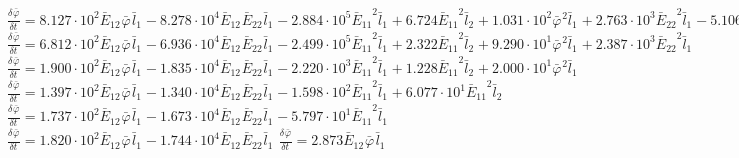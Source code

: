 $\frac{{\delta}^{} {\bar{\varphi}}_{}}{{\delta} {{{t}}_{}}^{}} = 8.127\cdot 10^{2}{{{\bar{E}}_{12}}^{}{{\bar{\varphi}}_{}}^{}{{\bar{l}}_{1}}^{}} - 8.278\cdot 10^{4}{{{\bar{E}}_{12}}^{}{{\bar{E}}_{22}}^{}{{\bar{l}}_{1}}^{}} - 2.884\cdot 10^{5}{{{\bar{E}}_{11}}^{2}{{\bar{l}}_{1}}^{}} + 6.724{{{\bar{E}}_{11}}^{2}{{\bar{l}}_{2}}^{}} + 1.031\cdot 10^{2}{{{\bar{\varphi}}_{}}^{2}{{\bar{l}}_{1}}^{}} + 2.763\cdot 10^{3}{{{\bar{E}}_{22}}^{2}{{\bar{l}}_{1}}^{}} - 5.106\cdot 10^{2}{{{\bar{E}}_{11}}^{2}}$
$\frac{{\delta}^{} {\bar{\varphi}}_{}}{{\delta} {{{t}}_{}}^{}} = 6.812\cdot 10^{2}{{{\bar{E}}_{12}}^{}{{\bar{\varphi}}_{}}^{}{{\bar{l}}_{1}}^{}} - 6.936\cdot 10^{4}{{{\bar{E}}_{12}}^{}{{\bar{E}}_{22}}^{}{{\bar{l}}_{1}}^{}} - 2.499\cdot 10^{5}{{{\bar{E}}_{11}}^{2}{{\bar{l}}_{1}}^{}} + 2.322{{{\bar{E}}_{11}}^{2}{{\bar{l}}_{2}}^{}} + 9.290\cdot 10^{1}{{{\bar{\varphi}}_{}}^{2}{{\bar{l}}_{1}}^{}} + 2.387\cdot 10^{3}{{{\bar{E}}_{22}}^{2}{{\bar{l}}_{1}}^{}}$
$\frac{{\delta}^{} {\bar{\varphi}}_{}}{{\delta} {{{t}}_{}}^{}} = 1.900\cdot 10^{2}{{{\bar{E}}_{12}}^{}{{\bar{\varphi}}_{}}^{}{{\bar{l}}_{1}}^{}} - 1.835\cdot 10^{4}{{{\bar{E}}_{12}}^{}{{\bar{E}}_{22}}^{}{{\bar{l}}_{1}}^{}} - 2.220\cdot 10^{3}{{{\bar{E}}_{11}}^{2}{{\bar{l}}_{1}}^{}} + 1.228{{{\bar{E}}_{11}}^{2}{{\bar{l}}_{2}}^{}} + 2.000\cdot 10^{1}{{{\bar{\varphi}}_{}}^{2}{{\bar{l}}_{1}}^{}}$
$\frac{{\delta}^{} {\bar{\varphi}}_{}}{{\delta} {{{t}}_{}}^{}} = 1.397\cdot 10^{2}{{{\bar{E}}_{12}}^{}{{\bar{\varphi}}_{}}^{}{{\bar{l}}_{1}}^{}} - 1.340\cdot 10^{4}{{{\bar{E}}_{12}}^{}{{\bar{E}}_{22}}^{}{{\bar{l}}_{1}}^{}} - 1.598\cdot 10^{2}{{{\bar{E}}_{11}}^{2}{{\bar{l}}_{1}}^{}} + 6.077\cdot 10^{1}{{{\bar{E}}_{11}}^{2}{{\bar{l}}_{2}}^{}}$
$\frac{{\delta}^{} {\bar{\varphi}}_{}}{{\delta} {{{t}}_{}}^{}} = 1.737\cdot 10^{2}{{{\bar{E}}_{12}}^{}{{\bar{\varphi}}_{}}^{}{{\bar{l}}_{1}}^{}} - 1.673\cdot 10^{4}{{{\bar{E}}_{12}}^{}{{\bar{E}}_{22}}^{}{{\bar{l}}_{1}}^{}} - 5.797\cdot 10^{1}{{{\bar{E}}_{11}}^{2}{{\bar{l}}_{1}}^{}}$
$\frac{{\delta}^{} {\bar{\varphi}}_{}}{{\delta} {{{t}}_{}}^{}} = 1.820\cdot 10^{2}{{{\bar{E}}_{12}}^{}{{\bar{\varphi}}_{}}^{}{{\bar{l}}_{1}}^{}} - 1.744\cdot 10^{4}{{{\bar{E}}_{12}}^{}{{\bar{E}}_{22}}^{}{{\bar{l}}_{1}}^{}}$
$\frac{{\delta}^{} {\bar{\varphi}}_{}}{{\delta} {{{t}}_{}}^{}} = 2.873{{{\bar{E}}_{12}}^{}{{\bar{\varphi}}_{}}^{}{{\bar{l}}_{1}}^{}}$
